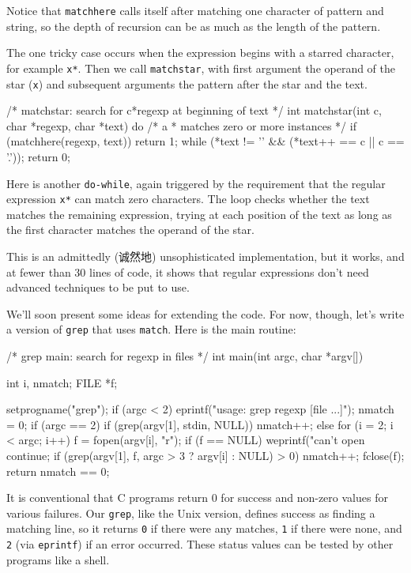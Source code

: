 Notice that \verb'matchhere' calls itself after matching one character of
pattern and string, so the depth of recursion can be as much as the length
of the pattern.

The one tricky case occurs when the expression begins with a starred
character, for example \verb'x*'. Then we call \verb'matchstar', with first
argument the operand of the star (\verb'x') and subsequent arguments the
pattern after the star and the text.
\begin{wellcode}
    /* matchstar: search for c*regexp at beginning of text */
    int matchstar(int c, char *regexp, char *text)
    {
        do {    /* a * matches zero or more instances */
            if (matchhere(regexp, text))
                return 1;
        } while (*text != '\0' && (*text++ == c || c == '.'));
        return 0;
    }
\end{wellcode}
Here is another \verb'do-while', again triggered by the requirement that
the regular expression \verb'x*' can match zero characters. The loop checks
whether the text matches the remaining expression, trying at each position
of the text as long as the first character matches the operand of the star.

This is an admittedly (诚然地) unsophisticated implementation, but it
works, and at fewer than 30 lines of code, it shows that regular
expressions don't need advanced techniques to be put to use.

We'll soon present some ideas for extending the code. For now, though,
let's write a version of \verb'grep' that uses \verb'match'. Here is the
main routine:
\begin{wellcode}
    /* grep main: search for regexp in files */
    int main(int argc, char *argv[])
    {
        int     i, nmatch;
        FILE    *f;

        setprogname("grep");
        if (argc < 2)
            eprintf("usage: grep regexp [file ...]");
        nmatch = 0;
        if (argc == 2) {
            if (grep(argv[1], stdin, NULL))
                nmatch++;
        } else {
            for (i = 2; i < argc; i++) {
                f = fopen(argv[i], "r");
                if (f == NULL) {
                    weprintf("can't open %
                    continue;
                }
                if (grep(argv[1], f, argc > 3 ? argv[i] : NULL) > 0)
                    nmatch++;
                fclose(f);
            }
        }
        return nmatch == 0;
    }
\end{wellcode}
It is conventional that C programs return 0 for success and non-zero values
for various failures. Our \verb'grep', like the Unix version, defines
success as finding a matching line, so it returns \verb'0' if there were
any matches, \verb'1' if there were none, and \verb'2' (via \verb'eprintf')
if an error occurred. These status values can be tested by other programs
like a shell.

